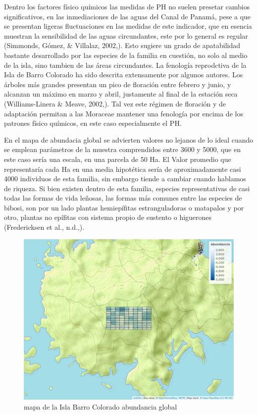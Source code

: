 \documentclass[11pt,]{article}
\begin{document}
Dentro los factores físico químicos las medidas de PH no suelen presetar
cambios significativos, en las inmediaciones de las aguas del Canal de
Panamá, pese a que se presentan ligeras fluctuaciones en las medidas de
este indicador, que en esencia muestran la sensibilidad de las aguas
circundantes, este por lo general es regular (Simmonds, Gómez, \&
Villalaz, 2002,). Esto sugiere un grado de apatabilidad bastante
desarrollado por las especies de la familia en cuestión, no solo al
medio de la isla, sino tambien de las áreas circundantes. La fenología
reprodctiva de la Isla de Barro Colorado ha sido descrita extensamente
por algunos autores. Los árboles más grandes presentan un pico de
floración entre febrero y junio, y alcanzan un máximo en marzo y abril,
justamente al final de la estación seca (Williams-Linera \& Meave,
2002,). Tal vez este régimen de floración y de adaptación permitan a las
Moraceae mantener una fenología por encima de los patrones físico
químicos, en este caso especialmente el PH.

En el mapa de abundacia global se advierten valores no lejanos de lo
ideal cuando se emplean parámetros de la muestra comprendidos entre 3600
y 5000, que en este caso sería una escala, en una parcela de 50 Ha. El
Valor promedio que representaría cada Ha en una media hipotética sería
de aproximadamente casi 4000 individuos de esta familia, sin embargo
tiende a cambiar cuando hablamos de riqueza. Si bien existen dentro de
esta familia, especies representativas de casi todas las formas de vida
leñosas, las formas más comunes entre las especies de bibosi, son por un
lado plantas hemiepífitas estranguladoras o matapalos y por otro,
plantas no epífitas con sistema propio de sustento o higuerones
(Fredericksen et al., n.d.,).

\begin{figure}
\centering
\includegraphics[width=1.00000\textwidth]{mapa_cuadros_abun_global.png}
\caption{mapa de la Isla Barro Colorado abundancia global
\label{fig:bci_map}}
\end{figure}
\end{document}
